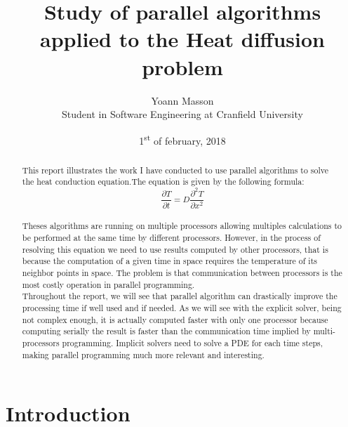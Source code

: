 \documentclass[12pt, a4paper]{report}
\title{Study of parallel algorithms applied to the Heat diffusion problem}
\author{Yoann Masson \\ Student in Software Engineering at Cranfield University}
\date{1\textsuperscript{st} of february, 2018}
\begin{document}
\begin{titlepage}
\maketitle
\end{titlepage}


\begin{abstract}
This report illustrates the work I have conducted to use parallel algorithms to solve the heat conduction equation.The equation is given by the following formula:\begin{equation}\frac{\partial T}{\partial t} = D\frac{\partial^2T }{\partial x^2}
\end{equation} 
\\Theses algorithms are running on multiple processors allowing multiples calculations to be performed at the same time by different processors. However, in the process of resolving this equation we need to use results computed by other processors, that is because the computation of a given time in space requires the temperature of its neighbor points in space. The problem is that communication between processors is the most costly operation in parallel programming.\\ Throughout the report, we will see that parallel algorithm can drastically improve the processing time if well used and if needed. As we will see with the explicit solver, being not complex enough, it is actually computed faster with only one processor because computing serially the result is faster than the communication time implied by multi-processors programming. Implicit solvers need to solve a PDE for each time steps, making parallel programming much more relevant and interesting.



\end{abstract}


\tableofcontents

\chapter*{Introduction}
\end{document}

